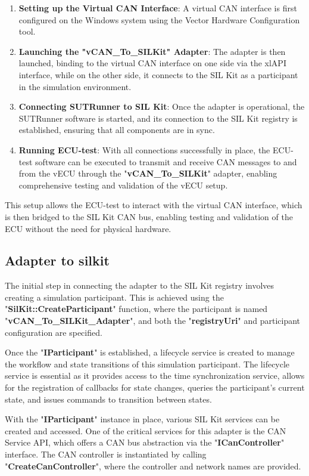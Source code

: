 \begin{enumerate}
\item \textbf{Setting up the Virtual CAN Interface}: A virtual CAN interface is first configured on the Windows system using the Vector Hardware Configuration tool.
\item \textbf{Launching the "vCAN\_To\_SILKit" Adapter}: The adapter is then launched, binding to the virtual CAN interface on one side via the xlAPI interface, while on the other side, it connects to the SIL Kit as a participant in the simulation environment.
\item \textbf{Connecting SUTRunner to SIL Kit}: Once the adapter is operational, the SUTRunner software is started, and its connection to the SIL Kit registry is established, ensuring that all components are in sync.
\item \textbf{Running ECU-test}: With all connections successfully in place, the ECU-test software can be executed to transmit and receive CAN messages to and from the vECU through the "\textbf{vCAN\_To\_SILKit}" adapter, enabling comprehensive testing and validation of the vECU setup.
\end{enumerate}

This setup allows the ECU-test to interact with the virtual CAN interface, which is then bridged to the SIL Kit CAN bus, enabling testing and validation of the ECU without the need for physical hardware.

\subsection{Adapter to silkit}
The initial step in connecting the adapter to the SIL Kit registry involves creating a simulation participant. This is achieved using the "\textbf{SilKit::CreateParticipant}" function, where the participant is named "\textbf{vCAN\_To\_SILKit\_Adapter}", and both the "\textbf{registryUri}" and participant configuration are specified.

Once the "\textbf{IParticipant}" is established, a lifecycle service is created to manage the workflow and state transitions of this simulation participant. The lifecycle service is essential as it provides access to the time synchronization service, allows for the registration of callbacks for state changes, queries the participant’s current state, and issues commands to transition between states.

With the "\textbf{IParticipant}" instance in place, various SIL Kit services can be created and accessed. One of the critical services for this adapter is the CAN Service API, which offers a CAN bus abstraction via the "\textbf{ICanController}" interface. The CAN controller is instantiated by calling "\textbf{CreateCanController}", where the controller and network names are provided.

